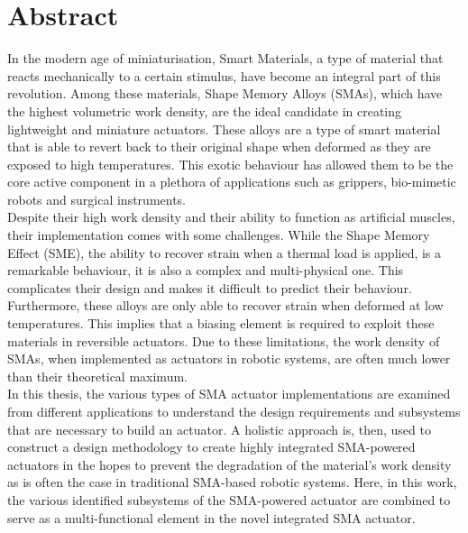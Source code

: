 

\cleardoublepage
\chapter*{Abstract}

In the modern age of miniaturisation, Smart Materials, a type of material that reacts mechanically to a certain stimulus, have become an integral part of this revolution. Among these materials, Shape Memory Alloys (SMAs), which have the highest volumetric work density, are the ideal candidate in creating lightweight and miniature actuators. These alloys are a type of smart material that is able to revert back to their original shape when deformed as they are exposed to high temperatures. This exotic behaviour has allowed them to be the core active component in a plethora of applications such as grippers, bio-mimetic robots and surgical instruments.\\

Despite their high work density and their ability to function as artificial muscles, their implementation comes with some challenges. While the Shape Memory Effect (SME), the ability to recover strain when a thermal load is applied, is a remarkable behaviour, it is also a complex and multi-physical one. This complicates their design and makes it difficult to predict their behaviour. Furthermore, these alloys are only able to recover strain when deformed at low temperatures. This implies that a biasing element is required to exploit these materials in reversible actuators. Due to these limitations, the work density of SMAs, when implemented as actuators in robotic systems, are often much lower than their theoretical maximum.\\

In this thesis, the various types of SMA actuator implementations are examined from different applications to understand the design requirements and subsystems that are necessary to build an actuator. A holistic approach is, then, used to construct a design methodology to create highly integrated SMA-powered actuators in the hopes to prevent the degradation of the material's work density as is often the case in traditional SMA-based robotic systems. Here, in this work, the various identified subsystems of the SMA-powered actuator are combined to serve as a multi-functional element in the novel integrated SMA actuator.\\

